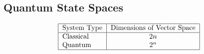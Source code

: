 \documentclass[12pt]{article}
\theoremstyle{mytheor}
\begin{document}
\subsection{Quantum State Spaces}

\begin{align*}
\begin{tabular}{ | l | c | }
  \hline			
  System Type & Dimensions of Vector Space \\ \hline
  Classical & $2n$ \\
  Quantum & $2^n$ \\
  \hline  
\end{tabular}
\end{align*}
\end{document}
